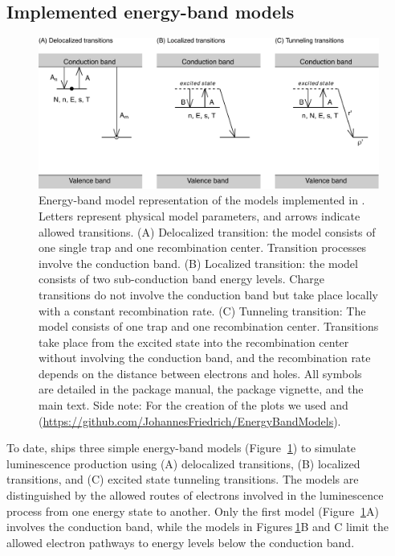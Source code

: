 \hypertarget{implemented-energy-band-models}{%
\subsection{Implemented energy-band
models}\label{implemented-energy-band-models}}

\begin{Schunk}
\begin{figure}

{\centering \includegraphics[width=140mm]{figures/Fig1-1} 

}

\caption{Energy-band model representation of the models implemented in . Letters represent physical model parameters, and arrows indicate allowed transitions. (A) Delocalized transition: the model consists of one single trap and one recombination center. Transition processes involve the conduction band. (B) Localized transition: the model consists of two sub-conduction band energy levels. Charge transitions do not involve the conduction band but take place locally with a constant recombination rate. (C) Tunneling transition: The model consists of one trap and one recombination center. Transitions take place from the excited state into the recombination center without involving the conduction band, and the recombination rate depends on the distance between electrons and holes. All symbols are detailed in the package manual, the package vignette, and the main text. Side note: For the creation of the plots we used  and  (\url{https://github.com/JohannesFriedrich/EnergyBandModels}).}\label{fig:Fig1}
\end{figure}
\end{Schunk}

To date,  ships three simple energy-band models
(Figure\(~\) \ref{fig:Fig1}) to simulate luminescence production using
(A) delocalized transitions, (B) localized transitions, and (C) excited
state tunneling transitions. The models are distinguished by the
allowed routes of electrons involved in the luminescence process from
one energy state to another. Only the first model (Figure\(~\)
\ref{fig:Fig1}A) involves the conduction band, while the models in
Figures\(~\)\ref{fig:Fig1}B and C limit the allowed electron pathways to
energy levels below the conduction band.

